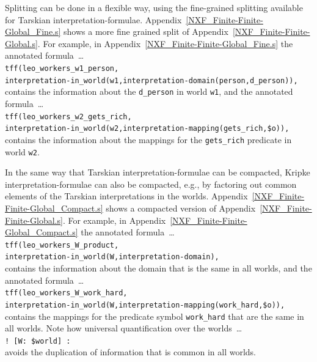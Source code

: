 \documentclass{easychair}
\newcommand{\smalltt}[1]{\small \texttt{#1}}
\begin{document}
Splitting can be done in a flexible way, using the fine-grained splitting available for
Tarskian interpretation-formulae.
Appendix~\ref{NXF_Finite-Finite-Global_Fine.s} shows a more fine grained split of 
Appendix~\ref{NXF_Finite-Finite-Global.s}.
For example, in Appendix~\ref{NXF_Finite-Finite-Global_Fine.s} the annotated formula~\ldots \\
\hspace*{0.5cm}\smalltt{tff(leo\_workers\_w1\_person,} \\
\hspace*{0.8cm}\smalltt{interpretation-in\_world(w1,interpretation-domain(person,d\_person)),} \\
contains the information about the {\tt d\_person} in world {\tt w1}, and the annotated 
formula~\ldots \\
\hspace*{0.5cm}\smalltt{tff(leo\_workers\_w2\_gets\_rich,} \\
\hspace*{0.8cm}\smalltt{interpretation-in\_world(w2,interpretation-mapping(gets\_rich,\$o)),} \\
contains the information about the mappings for the {\tt gets\_rich} predicate in world {\tt w2}.

In the same way that Tarskian interpretation-formulae can be compacted, Kripke
interpretation-formulae can also be compacted, e.g., by factoring out common elements of
the Tarskian interpretations in the worlds.
Appendix~\ref{NXF_Finite-Finite-Global_Compact.s} shows a compacted version of
Appendix~\ref{NXF_Finite-Finite-Global.s}.
For example, in Appendix~\ref{NXF_Finite-Finite-Global_Compact.s} the annotated formula~\ldots \\
\hspace*{0.5cm}\smalltt{tff(leo\_workers\_W\_product,} \\
\hspace*{0.8cm}\smalltt{interpretation-in\_world(W,interpretation-domain),} \\
contains the information about the domain that is the same in all worlds, and the 
annotated formula~\ldots \\
\hspace*{0.5cm}\smalltt{tff(leo\_workers\_W\_work\_hard,} \\
\hspace*{0.8cm}\smalltt{interpretation-in\_world(W,interpretation-mapping(work\_hard,\$o)),} \\
contains the mappings for the predicate symbol {\tt work\_hard} that are the same in all worlds.
Note how universal quantification over the worlds~\ldots \\
\hspace*{0.5cm}\smalltt{! [W: \$world] :} \\
avoids the duplication of information that is common in all worlds.
\end{document}
